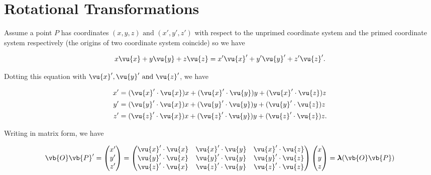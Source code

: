 \documentclass[a4paper,12pt]{report}
\begin{document}
\chapter{Rotational Transformations}

Assume a point \(P\) has coordinates \((x, y, z) \text{ and }  (x', y', z')\) with respect to the unprimed coordinate system and the primed coordinate system respectively (the origins of two coordinate system coincide) so we have

\begin{equation}
	x \vu{x}  + y \vu{y} + z \vu{z} = x' \vu{x} ' + y' \vu{y} ' + z' \vu{z} '.  
\end{equation}

Dotting this equation with \(\vu{x} ', \vu{y} ' \text{ and } \vu{z} '\), we have 

\begin{equation}
	\begin{aligned}
	x' &= (\vu{x} ' \cdot \vu{x} )x + (\vu{x} ' \cdot \vu{y} )y + (\vu{x} ' \cdot \vu{z} )z \\
	y' &= (\vu{y} ' \cdot \vu{x} )x + (\vu{y} ' \cdot \vu{y} )y + (\vu{y} ' \cdot \vu{z} )z \\
	z' &= (\vu{z} ' \cdot \vu{x} )x + (\vu{z} ' \cdot \vu{y} )y + (\vu{z} ' \cdot \vu{z} )z.
	\end{aligned}
\end{equation}

Writing in matrix form, we have 

\begin{equation}
	\vb{O} \vb{P} ' = \begin{pmatrix}
	x'\\
	y'\\
	z'
	\end{pmatrix}
	= \begin{pmatrix}
\vu{x} ' \cdot \vu{x}  & \vu{x} ' \cdot \vu{y}  & \vu{x} ' \cdot \vu{z}  \\
\vu{y} ' \cdot \vu{x}  & \vu{y} ' \cdot \vu{y} & \vu{y} ' \cdot \vu{z} \\
\vu{z} ' \cdot \vu{x}  & \vu{z} ' \cdot \vu{y}  & \vu{z} ' \cdot \vu{z} 
	\end{pmatrix}
	\begin{pmatrix}
	x\\
	y\\
	z
	\end{pmatrix}
	=
	 \boldsymbol{\lambda } (\vb{O} \vb{P} )
\end{equation}
\end{document}
